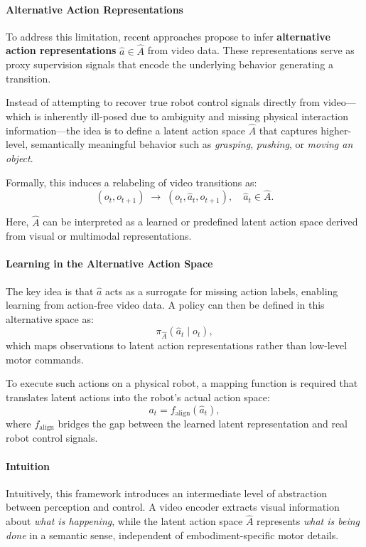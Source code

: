 \paragraph{Alternative Action Representations}

To address this limitation, recent approaches propose to infer \textbf{alternative action representations} $\hat{a} \in \hat{A}$ from video data. These representations serve as proxy supervision signals that encode the underlying behavior generating a transition.

Instead of attempting to recover true robot control signals directly from video—which is inherently ill-posed due to ambiguity and missing physical interaction information—the idea is to define a latent action space $\hat{A}$ that captures higher-level, semantically meaningful behavior such as \textit{grasping}, \textit{pushing}, or \textit{moving an object}.

Formally, this induces a relabeling of video transitions as:
\[
(o_t, o_{t+1}) \;\rightarrow\; (o_t, \hat{a}_t, o_{t+1}), \quad \hat{a}_t \in \hat{A}.
\]

Here, $\hat{A}$ can be interpreted as a learned or predefined latent action space derived from visual or multimodal representations.

\paragraph{Learning in the Alternative Action Space}

The key idea is that $\hat{a}$ acts as a surrogate for missing action labels, enabling learning from action-free video data. A policy can then be defined in this alternative space as:
\[
\pi_{\hat{A}}(\hat{a}_t \mid o_t),
\]
which maps observations to latent action representations rather than low-level motor commands.

To execute such actions on a physical robot, a mapping function is required that translates latent actions into the robot’s actual action space:
\[
a_t = f_{\text{align}}(\hat{a}_t),
\]
where $f_{\text{align}}$ bridges the gap between the learned latent representation and real robot control signals.

\paragraph{Intuition}

Intuitively, this framework introduces an intermediate level of abstraction between perception and control. A video encoder extracts visual information about \textit{what is happening}, while the latent action space $\hat{A}$ represents \textit{what is being done} in a semantic sense, independent of embodiment-specific motor details.


